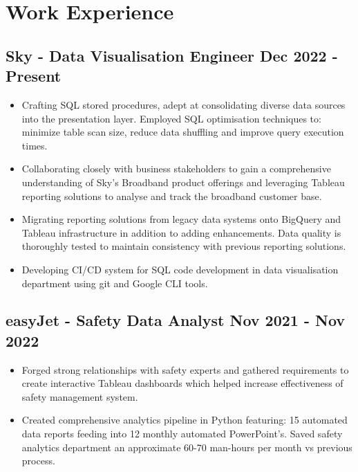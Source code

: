 \documentclass[a4paper,9pt]{article}
\begin{document}
\section*{Work Experience}
\subsection*{\textbf{Sky - Data Visualisation Engineer} \hfill  Dec 2022 - Present}
\begin{itemize}[noitemsep]
    \item Crafting SQL stored procedures, adept at consolidating diverse data sources into the presentation layer. Employed SQL optimisation techniques to: minimize table scan size, reduce data shuffling and improve query execution times.
    \item Collaborating closely with business stakeholders to gain a comprehensive understanding of Sky's Broadband product offerings and leveraging Tableau reporting solutions to analyse and track the broadband customer base.
    \item Migrating reporting solutions from legacy data systems onto BigQuery and Tableau infrastructure in addition to adding enhancements. Data quality is thoroughly tested to maintain consistency with previous reporting solutions.
    \item Developing CI/CD system for SQL code development in data visualisation department using git and Google CLI tools. 
\end{itemize}

\subsection*{\textbf{easyJet - Safety Data Analyst} \hfill  Nov 2021 - Nov 2022}
\begin{itemize}[noitemsep]
    \item Forged strong relationships with safety experts and gathered requirements to create interactive Tableau dashboards which helped increase effectiveness of safety management system.
    \item Created comprehensive analytics pipeline in Python featuring: 15 automated data reports feeding into 12 monthly automated PowerPoint's. Saved safety analytics department an approximate 60-70 man-hours per month vs previous process.
\end{itemize}
\end{document}
